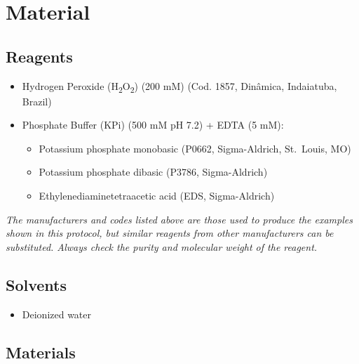 \documentclass[
  9pt,
  american,
  a5paper,
  extrafontsizes,onecolumn,openright
  ]{memoir}
\providecommand{\tightlist}{%
  \setlength{\itemsep}{0pt}\setlength{\parskip}{0pt}}
\begin{document}
\newpage

\section{Material}\label{cat_detailed_protocol}

\subsection{Reagents}\label{reagents}

\begin{itemize}
\tightlist
\item
  Hydrogen Peroxide (H\textsubscript{2}O\textsubscript{2}) (200 mM) (Cod. 1857, Dinâmica, Indaiatuba, Brazil)
\item
  Phosphate Buffer (KPi) (500 mM pH 7.2) + EDTA (5 mM):

  \begin{itemize}
  \tightlist
  \item
    Potassium phosphate monobasic (P0662, Sigma-Aldrich, St.~Louis, MO)
  \item
    Potassium phosphate dibasic (P3786, Sigma-Aldrich)
  \item
    Ethylenediaminetetraacetic acid (EDS, Sigma-Aldrich)
  \end{itemize}
\end{itemize}

\begin{greybox}[frametitle = Note]
\emph{The manufacturers and codes listed above are those used to produce the examples shown in this protocol, but similar reagents from other manufacturers can be substituted. Always check the purity and molecular weight of the reagent.}

\end{greybox}

\subsection{Solvents}\label{solvents}

\begin{itemize}
\tightlist
\item
  Deionized water
\end{itemize}

\subsection{Materials}\label{materials}
\end{document}
